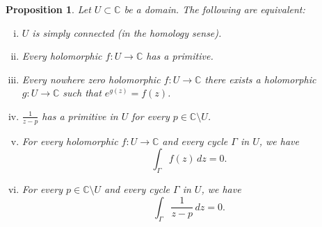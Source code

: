 \documentclass[12pt,openany]{book}
\newcommand{\C}{{\mathbb{C}}}
\theoremstyle{plain}
\newtheorem{prop}[thm]{Proposition}
\theoremstyle{remark}
\theoremstyle{definition}
\theoremstyle{exercise}
\theoremstyle{example}
\begin{document}
\begin{prop}
Let $U \subset \C$ be a domain.  The following are equivalent:
\begin{enumerate}[(i)]
\item \label{thm:simplyconnected:i}
$U$ is simply connected (in the homology sense).
\item \label{thm:simplyconnected:ii}
Every holomorphic $f \colon U \to \C$ has a primitive.
\item \label{thm:simplyconnected:iii}
Every nowhere zero holomorphic $f \colon U \to \C$ there exists
a holomorphic $g \colon U \to \C$ such that $e^{g(z)} = f(z)$.
\item \label{thm:simplyconnected:iv}
$\frac{1}{z-p}$ has a primitive in $U$ for every $p \in \C \setminus U$.
\item \label{thm:simplyconnected:v}
For every holomorphic $f \colon U \to \C$ and every
cycle $\Gamma$ in $U$, we have
\begin{equation*}
\int_\Gamma f(z) \, dz = 0 .
\end{equation*}
\item \label{thm:simplyconnected:vi}
For every $p \in \C \setminus U$ and every
cycle $\Gamma$ in $U$, we have
\begin{equation*}
\int_\Gamma \frac{1}{z-p} \, dz = 0 .
\end{equation*}
\end{enumerate}
\end{prop}
\end{document}

